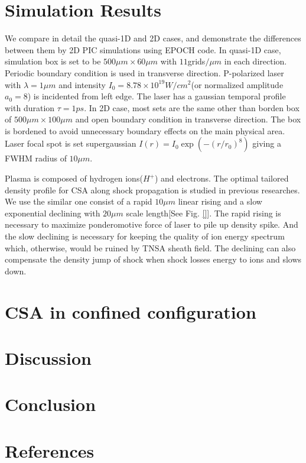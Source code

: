 \documentclass[12pt]{iopart}
\begin{document}
\section{Simulation Results}
\label{simulation}
We compare in detail the quasi-1D and 2D cases, and demonstrate the differences between them by 2D PIC simulations using EPOCH code\cite{}. In quasi-1D case, simulation box is set to be $500\mu m \times 60\mu m$ with $11$grids$/\mu m$ in each direction. Periodic boundary condition is used in transverse direction. P-polarized laser with $\lambda=1\mu m$ and intensity $I_0=8.78\times 10^{19}W/cm^2$(or normalized amplitude $a_0 = 8$) is incidented from left edge. The laser has a gaussian temporal profile with duration $\tau=1ps$. In 2D case, most sets are the same other than borden box of $500\mu m \times 100\mu m$ and open boundary condition in transverse direction. The box is bordened to avoid unnecessary boundary effects on the main physical area. Laser focal spot is set supergaussian $I(r)=I_0\exp(-(r/r_0)^8)$ giving a FWHM radius of $10\mu m$.

Plasma is composed of hydrogen ions($H^+$) and electrons. The optimal tailored density profile for CSA along shock propagation is studied in previous researches\cite{fiuza_ion_2013,fiuza_laser-driven_2012,boella_numerical_2017}. We use the similar one consist of a rapid $10\mu m$ linear rising and a slow exponential declining with $20\mu m$ scale length[See Fig. \ref{}]. The rapid rising is necessary to maximize ponderomotive force of laser to pile up density spike. And the slow declining is necessary for keeping the quality of ion energy spectrum which, otherwise, would be ruined by TNSA sheath field. The declining can also compensate the density jump  of shock when shock losses energy to ions and slows down\cite{macchi_solitary_2012}. 

\section{CSA in confined configuration}
\label{confined}
 
\section{Discussion}
\label{discussion}


\section{Conclusion}
\label{conclusion}
 
\ack


\section*{References}


\end{document}

